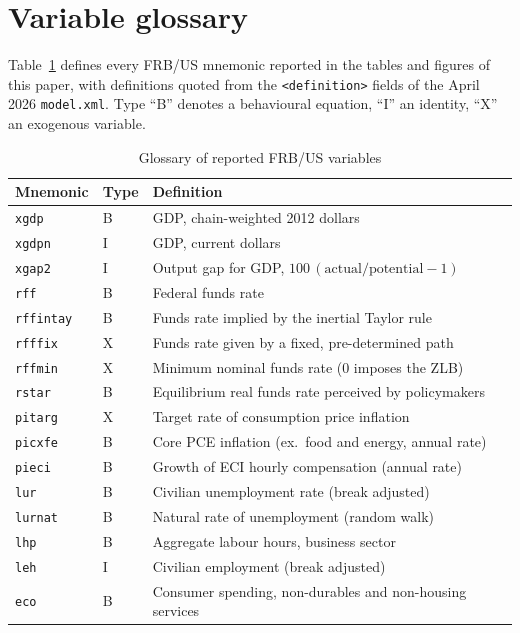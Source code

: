 \appendix

\section{Variable glossary}
\label{app:glossary}

Table~\ref{tab:glossary} defines every FRB/US mnemonic reported in the tables and figures of this paper, with definitions quoted from the \texttt{<definition>} fields of the April 2026 \texttt{model.xml}. Type ``B'' denotes a behavioural equation, ``I'' an identity, ``X'' an exogenous variable.

\begin{table}[htbp]
\centering
\caption{Glossary of reported FRB/US variables}
\label{tab:glossary}
\footnotesize
\begin{tabular}{llp{9.2cm}}
\toprule
Mnemonic & Type & Definition \\
\midrule
\texttt{xgdp}   & B & GDP, chain-weighted 2012 dollars \\
\texttt{xgdpn}  & I & GDP, current dollars \\
\texttt{xgap2}  & I & Output gap for GDP, $100\,(\text{actual}/\text{potential}-1)$ \\
\texttt{rff}    & B & Federal funds rate \\
\texttt{rffintay} & B & Funds rate implied by the inertial Taylor rule \\
\texttt{rfffix} & X & Funds rate given by a fixed, pre-determined path \\
\texttt{rffmin} & X & Minimum nominal funds rate (0 imposes the ZLB) \\
\texttt{rstar}  & B & Equilibrium real funds rate perceived by policymakers \\
\texttt{pitarg} & X & Target rate of consumption price inflation \\
\texttt{picxfe} & B & Core PCE inflation (ex.\ food and energy, annual rate) \\
\texttt{pieci}  & B & Growth of ECI hourly compensation (annual rate) \\
\texttt{lur}    & B & Civilian unemployment rate (break adjusted) \\
\texttt{lurnat} & B & Natural rate of unemployment (random walk) \\
\texttt{lhp}    & B & Aggregate labour hours, business sector \\
\texttt{leh}    & I & Civilian employment (break adjusted) \\
\texttt{eco}    & B & Consumer spending, non-durables and non-housing services \\

\end{tabular}
\end{table}
